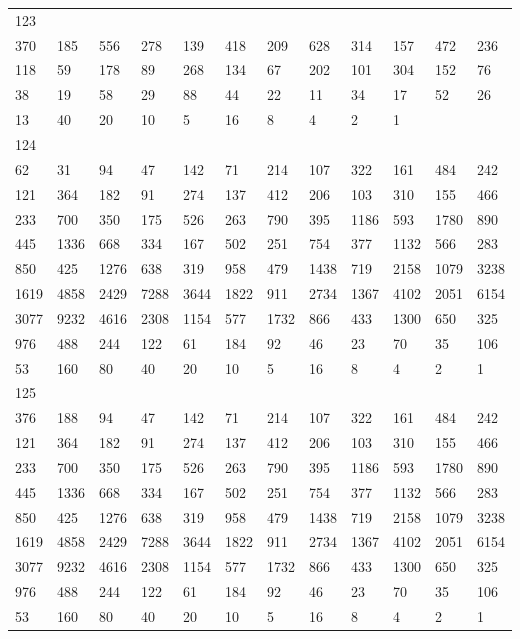 \begin{longtable}{llllllllllll}
123&&&&&&&&&&&\\
370& 185& 556& 278& 139& 418& 209& 628& 314& 157& 472& 236\\
118& 59& 178& 89& 268& 134& 67& 202& 101& 304& 152& 76\\
38& 19& 58& 29& 88& 44& 22& 11& 34& 17& 52& 26\\
13& 40& 20& 10& 5& 16& 8& 4& 2& 1& \\

124&&&&&&&&&&&\\
62& 31& 94& 47& 142& 71& 214& 107& 322& 161& 484& 242\\
121& 364& 182& 91& 274& 137& 412& 206& 103& 310& 155& 466\\
233& 700& 350& 175& 526& 263& 790& 395& 1186& 593& 1780& 890\\
445& 1336& 668& 334& 167& 502& 251& 754& 377& 1132& 566& 283\\
850& 425& 1276& 638& 319& 958& 479& 1438& 719& 2158& 1079& 3238\\
1619& 4858& 2429& 7288& 3644& 1822& 911& 2734& 1367& 4102& 2051& 6154\\
3077& 9232& 4616& 2308& 1154& 577& 1732& 866& 433& 1300& 650& 325\\
976& 488& 244& 122& 61& 184& 92& 46& 23& 70& 35& 106\\
53& 160& 80& 40& 20& 10& 5& 16& 8& 4& 2& 1\\

125&&&&&&&&&&&\\
376& 188& 94& 47& 142& 71& 214& 107& 322& 161& 484& 242\\
121& 364& 182& 91& 274& 137& 412& 206& 103& 310& 155& 466\\
233& 700& 350& 175& 526& 263& 790& 395& 1186& 593& 1780& 890\\
445& 1336& 668& 334& 167& 502& 251& 754& 377& 1132& 566& 283\\
850& 425& 1276& 638& 319& 958& 479& 1438& 719& 2158& 1079& 3238\\
1619& 4858& 2429& 7288& 3644& 1822& 911& 2734& 1367& 4102& 2051& 6154\\
3077& 9232& 4616& 2308& 1154& 577& 1732& 866& 433& 1300& 650& 325\\
976& 488& 244& 122& 61& 184& 92& 46& 23& 70& 35& 106\\
53& 160& 80& 40& 20& 10& 5& 16& 8& 4& 2& 1\\


\end{longtable}
